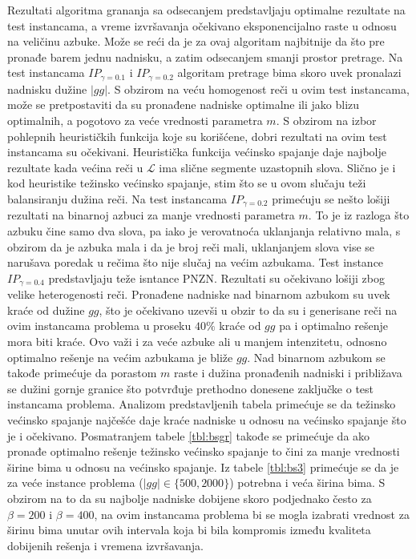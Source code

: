 \documentclass[12pt,oneside]{memoir}
\begin{document}
Rezultati algoritma grananja sa odsecanjem predstavljaju optimalne rezultate
na test instancama, a vreme izvršavanja očekivano eksponencijalno raste u odnosu na
veličinu azbuke. Može se reći da je za ovaj algoritam najbitnije da što pre pronađe barem jednu
nadnisku, a zatim odsecanjem smanji prostor pretrage.
Na test instancama $IP_{\gamma=0.1}$ i $IP_{\gamma=0.2}$ algoritam pretrage bima
skoro uvek pronalazi nadnisku dužine $|gg|$. S obzirom na veću homogenost reči
u ovim test instancama, može se pretpostaviti da su pronađene nadniske
optimalne ili jako blizu optimalnih, a pogotovo za veće vrednosti parametra $m$.
S obzirom na izbor pohlepnih heurističkih funkcija koje su korišćene,
dobri rezultati na ovim test instancama su očekivani.
Heuristička funkcija većinsko spajanje daje najbolje rezultate
kada većina reči u $\mathcal{L}$ ima slične segmente uzastopnih slova.
Slično je i kod heuristike težinsko većinsko spajanje, stim što se u ovom
slučaju teži balansiranju dužina reči.
Na test instancama $IP_{\gamma=0.2}$ primećuju se nešto lošiji rezultati
na binarnoj azbuci za manje vrednosti parametra $m$. To je iz razloga
što azbuku čine samo dva slova, pa iako je verovatnoća uklanjanja relativno mala,
s obzirom da je azbuka mala i da je broj reči mali, uklanjanjem
slova vise se narušava poredak u rečima što nije slučaj na većim azbukama.
Test instance $IP_{\gamma=0.4}$ predstavljaju teže isntance PNZN.
Rezultati su očekivano lošiji zbog velike heterogenosti reči. Pronađene nadniske nad binarnom azbukom
su uvek kraće od dužine $gg$, što je očekivano uzevši u obzir to da su i generisane
reči na ovim instancama problema u proseku $40\%$ kraće od $gg$ pa i optimalno rešenje
mora biti kraće. Ovo važi i za veće azbuke ali u manjem intenzitetu,
odnosno optimalno rešenje na većim azbukama je bliže $gg$.
Nad binarnom azbukom se takođe primećuje da porastom $m$ raste i dužina pronađenih nadniski
i približava se dužini gornje granice što potvrđuje prethodno donesene zaključke
o test instancama problema.
Analizom predstavljenih tabela primećuje se da težinsko većinsko spajanje
najčešće daje kraće nadniske u odnosu na većinsko spajanje što je i očekivano.
Posmatranjem tabele \ref{tbl:bsgr} takođe se primećuje da ako pronađe optimalno rešenje
težinsko većinsko spajanje to čini za manje vrednosti širine bima u odnosu na
većinsko spajanje. Iz tabele \ref{tbl:bs3} primećuje se da je za veće instance problema
($|gg| \in \{500,2000\}$) potrebna i veća širina bima. S obzirom na to da su najbolje
nadniske dobijene skoro podjednako često za $\beta=200$ i $\beta=400$, na ovim instancama problema
bi se mogla izabrati vrednost za širinu bima unutar ovih intervala koja bi bila kompromis između
kvaliteta dobijenih rešenja i vremena izvršavanja.
\end{document}
